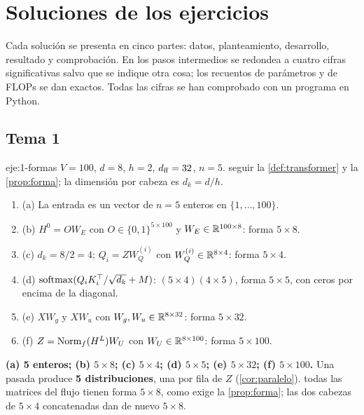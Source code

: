 \chapter{Soluciones de los ejercicios}
\label{ap:soluciones}

Cada solución se presenta en cinco partes: datos, planteamiento, desarrollo, resultado y comprobación. En los pasos intermedios se redondea a cuatro cifras significativas salvo que se indique otra cosa; los recuentos de parámetros y de FLOPs se dan exactos. Todas las cifras se han comprobado con un programa en Python.

\section{Tema 1}

\begin{solucion}{eje:1-formas}
\datos $V=100$, $d=8$, $h=2$, $d_{\mathrm{ff}}=32$, $n=5$.
\planteamiento seguir la \cref{def:transformer} y la \cref{prop:forma}; la dimensión por cabeza es $d_k=d/h$.
\pasos
\begin{enumerate}[label=\arabic*.]
  \item (a) La entrada es un vector de $n=5$ enteros en $\{1,\dots,100\}$.
  \item (b) $H^{0}=OW_E$ con $O\in\{0,1\}^{5\times 100}$ y $W_E\in\mathbb{R}^{100\times 8}$: forma $5\times 8$.
  \item (c) $d_k=8/2=4$; $Q_i=ZW_Q^{(i)}$ con $W_Q^{(i)}\in\mathbb{R}^{8\times 4}$: forma $5\times 4$.
  \item (d) $\operatorname{softmax}(Q_iK_i^{\top}/\sqrt{d_k}+M)$: $(5\times 4)(4\times 5)$, forma $5\times 5$, con ceros por encima de la diagonal.
  \item (e) $XW_g$ y $XW_u$ con $W_g,W_u\in\mathbb{R}^{8\times 32}$: forma $5\times 32$.
  \item (f) $Z=\operatorname{Norm}_f(H^{L})W_U$ con $W_U\in\mathbb{R}^{8\times 100}$: forma $5\times 100$.
\end{enumerate}
\resultado \textbf{(a) 5 enteros; (b) $5\times 8$; (c) $5\times 4$; (d) $5\times 5$; (e) $5\times 32$; (f) $5\times 100$.} Una pasada produce \textbf{5 distribuciones}, una por fila de $Z$ (\cref{cor:paralelo}).
\comprobacion todas las matrices del flujo tienen forma $5\times 8$, como exige la \cref{prop:forma}; las dos cabezas de $5\times 4$ concatenadas dan de nuevo $5\times 8$.
\end{solucion}

